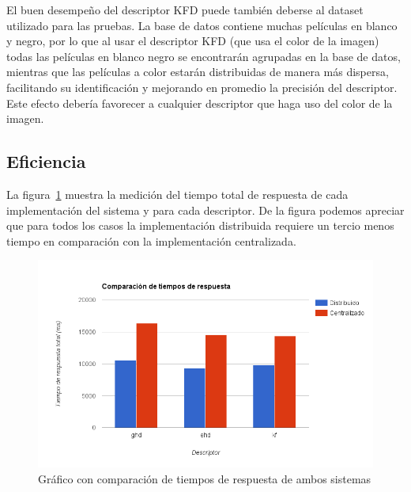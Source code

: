 El buen desempeño del descriptor KFD puede también deberse al dataset utilizado para las pruebas. La base de datos contiene muchas películas en blanco y negro, por lo que al usar el descriptor KFD (que usa el color de la imagen) todas las películas en blanco negro se encontrarán agrupadas en la base de datos, mientras que las películas a color estarán distribuidas de manera más dispersa, facilitando su identificación y mejorando en promedio la precisión del descriptor. Este efecto debería favorecer a cualquier descriptor que haga uso del color de la imagen.

\subsection{Eficiencia}

La figura~\ref{resultados_tiempos_total} muestra la medición del tiempo total de respuesta de cada implementación del sistema y para cada descriptor. De la figura podemos apreciar que para todos los casos la implementación distribuida requiere un tercio menos tiempo en comparación con la implementación centralizada. 

	\begin{figure}[!h]
		\centering
		\includegraphics[width=\textwidth]{imagenes/cap5/resultados_tiempos_total.png}
		\caption{Gráfico con comparación de tiempos de respuesta de ambos sistemas}
		\label{resultados_tiempos_total}
	\end{figure}

